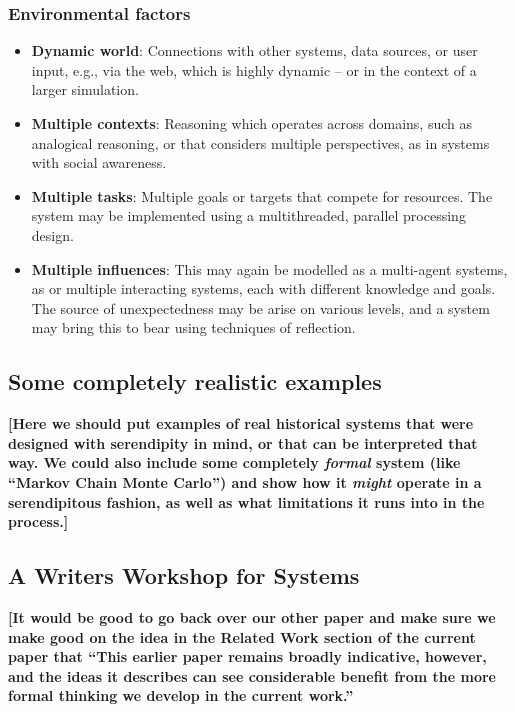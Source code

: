 \subsubsection*{Environmental factors}

\begin{itemize}
\item \textbf{Dynamic world}: Connections with other systems, data
  sources, or user input, e.g., via the web, which is highly dynamic --
  or in the context of a larger simulation.
\item \textbf{Multiple contexts}: Reasoning which operates across
  domains, such as analogical reasoning, or that considers multiple
  perspectives, as in systems with social awareness.
\item \textbf{Multiple tasks}: Multiple goals or targets that compete
  for resources.  The system may be implemented using a multithreaded,
  parallel processing design.
\item \textbf{Multiple influences}: This may again be modelled as a
  multi-agent systems, as or multiple interacting systems, each with
  different knowledge and goals.  The source of unexpectedness may be
  arise on various levels, and a system may bring this to bear using
  techniques of reflection.
\end{itemize}

% 

\subsection{Some completely realistic examples}

\textbf{[Here we should put examples of real historical systems that
    were designed with serendipity in mind, or that can be interpreted
    that way.  We could also include some completely \emph{formal}
    system (like ``Markov Chain Monte Carlo'') and show how it
    \emph{might} operate in a serendipitous fashion, as well as what
    limitations it runs into in the process.]}

\subsection{A Writers Workshop for Systems}

\textbf{[It would be good to go back over our other paper and make
    sure we make good on the idea in the Related Work section of the
    current paper that ``This earlier paper remains broadly
    indicative, however, and the ideas it describes can see
    considerable benefit from the more formal thinking we develop in
    the current work.''}

